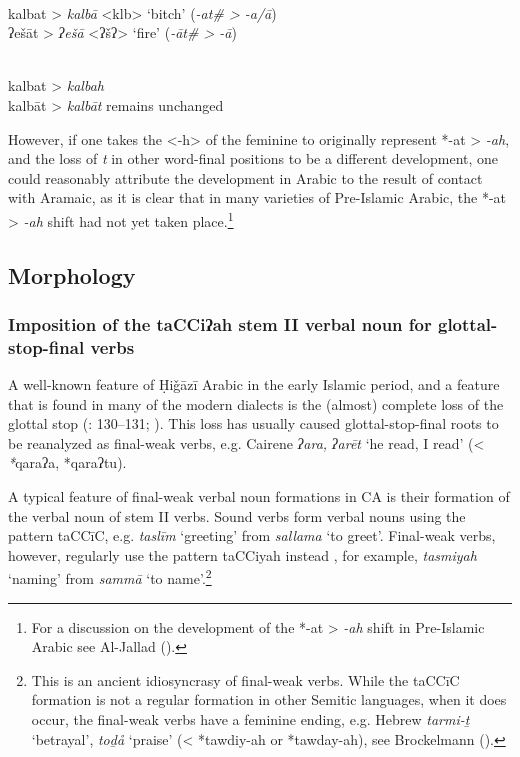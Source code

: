 \documentclass[output=paper]{langsci/langscibook}
\begin{document}
 \\
\ea *kalbat > \textit{kalbā} <klb> ‘bitch’ (\textit{-at\# > -a/ā})\\
\ex *ʔešāt > \textit{ʔešā} <ʔšʔ> ‘fire’ (\textit{-āt\# > -ā})\\
\z
\z

 \\
\ea *kalbat > \textit{kalbah}\\
\ex *kalbāt > \textit{kalbāt} remains unchanged \\
\z
\z

However, if one takes the <-h> of the feminine to originally represent *-at > \textit{-ah}, and the loss of \textit{t} in other word-final positions to be a different development, one could reasonably attribute the development in Arabic to the result of contact with Aramaic, as it is clear that in many varieties of Pre-Islamic Arabic, the *-at > \textit{-ah} shift had not yet taken place.\footnote{For a discussion on the development of the *-at > \textit{-ah} shift in Pre-Islamic Arabic see Al-Jallad (\citeyear[157--158]{Al-Jallad2017Greek}).}

\subsection{\label{bkm:Ref13577493}Morphology}
\subsubsection{\label{bkm:Ref13224791}Imposition of the taCCiʔah stem II verbal noun for glottal-stop-final verbs}

A well-known feature of Ḥiǧāzī Arabic in the early Islamic period, and a feature that is found in many of the modern dialects is the (almost) complete loss of the glottal stop (\citealt{Rabin1951}: 130--131; \citealt{vanPutten2018}). This loss has usually caused glottal-stop-final roots to be reanalyzed as final-weak verbs, e.g. Cairene \textit{ʔara,} \textit{ʔarēt} ‘he read, I read’ (< \textit{*}qaraʔa, *qaraʔtu).

A typical feature of final-weak verbal noun formations in CA is their formation of the verbal noun of stem II verbs. Sound verbs form verbal nouns using the pattern taCCīC, e.g. \textit{taslīm} ‘greeting’ from \textit{sallama} ‘to greet’. Final-weak verbs, however, regularly use the pattern taCCiyah instead \citep[44]{Fischer2002}, for example, \textit{tasmiyah} ‘naming’ from \textit{sammā} ‘to name’.\footnote{This is an ancient idiosyncrasy of final-weak verbs. While the taCCīC formation is not a regular formation in other Semitic languages, when it does occur, the final-weak verbs have a feminine ending, e.g. Hebrew \textit{tarmi-ṯ} ‘betrayal’, \textit{toḏå} ‘praise’ (< *tawdiy-ah or *tawday-ah), see Brockelmann (\citeyear[385--387]{Brockelmann1908}).} 
\end{document}

